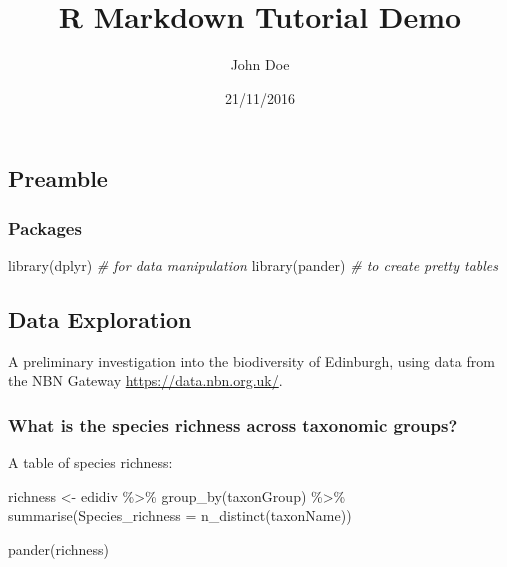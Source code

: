 \documentclass[
  12pt,
]{article}
\title{R Markdown Tutorial Demo}
\author{John Doe}
\date{21/11/2016}
\newenvironment{Shaded}{\begin{snugshade}}{\end{snugshade}}
\newcommand{\AttributeTok}[1]{\textcolor[rgb]{0.77,0.63,0.00}{#1}}
\newcommand{\CommentTok}[1]{\textcolor[rgb]{0.56,0.35,0.01}{\textit{#1}}}
\newcommand{\FunctionTok}[1]{\textcolor[rgb]{0.00,0.00,0.00}{#1}}
\newcommand{\NormalTok}[1]{#1}
\newcommand{\OtherTok}[1]{\textcolor[rgb]{0.56,0.35,0.01}{#1}}
\newcommand{\SpecialCharTok}[1]{\textcolor[rgb]{0.00,0.00,0.00}{#1}}
\begin{document}
\maketitle

\hypertarget{preamble}{%
\subsection{Preamble}\label{preamble}}

\hypertarget{packages}{%
\subsubsection{Packages}\label{packages}}

\begin{Shaded}
\begin{Highlighting}[]
\FunctionTok{library}\NormalTok{(dplyr) }\CommentTok{\# for data manipulation}
\FunctionTok{library}\NormalTok{(pander) }\CommentTok{\# to create pretty tables}
\end{Highlighting}
\end{Shaded}

\hypertarget{data-exploration}{%
\subsection{Data Exploration}\label{data-exploration}}

A preliminary investigation into the biodiversity of Edinburgh, using
data from the NBN Gateway \url{https://data.nbn.org.uk/}.

\hypertarget{what-is-the-species-richness-across-taxonomic-groups}{%
\subsubsection{What is the species richness across taxonomic
groups?}\label{what-is-the-species-richness-across-taxonomic-groups}}

A table of species richness:

\begin{Shaded}
\begin{Highlighting}[]
\NormalTok{richness }\OtherTok{\textless{}{-}} 
\NormalTok{  edidiv }\SpecialCharTok{\%\textgreater{}\%}
  \FunctionTok{group\_by}\NormalTok{(taxonGroup) }\SpecialCharTok{\%\textgreater{}\%}
  \FunctionTok{summarise}\NormalTok{(}\AttributeTok{Species\_richness =} \FunctionTok{n\_distinct}\NormalTok{(taxonName)) }

\FunctionTok{pander}\NormalTok{(richness)}
\end{Highlighting}
\end{Shaded}
\end{document}
